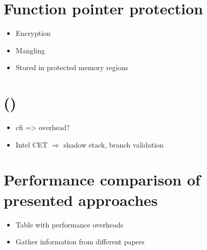 \section{Function pointer protection}
\label{sec:function-pointer-protection-improvements}

\begin{itemize}
	\item{Encryption}
	\item{Mangling}
	\item{Stored in protected memory regions}
\end{itemize}

\section{ ()}
\label{sec:control-flow-integrity}

\begin{itemize}
	\item{\gls{cfi} => overhead?}
	\item{Intel CET $\Rightarrow$ shadow stack, branch validation}
\end{itemize}

\section{Performance comparison of presented approaches}
\label{sec:performance-comparison}

\begin{itemize}
	\item{Table with performance overheads}
	\item{Gather information from different papers}
\end{itemize}
